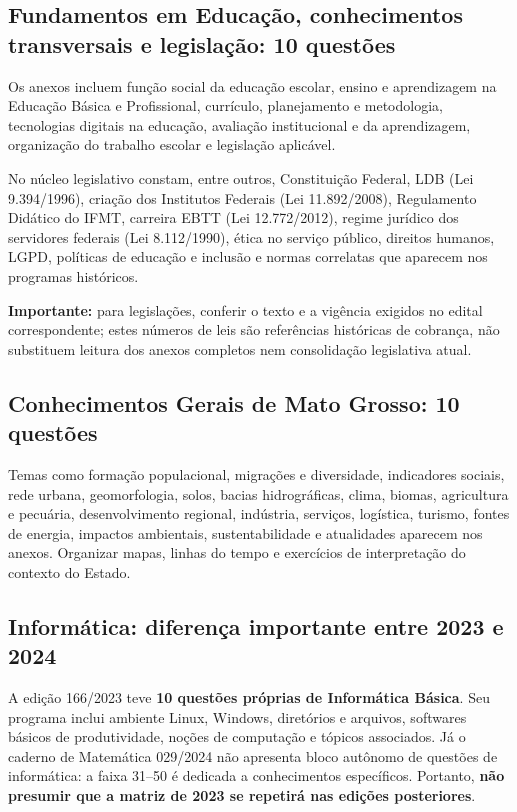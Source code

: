 \documentclass[11pt,a4paper]{article}
\begin{document}
\subsection{Fundamentos em Educação, conhecimentos transversais e legislação: 10 questões}
Os anexos incluem função social da educação escolar, ensino e aprendizagem na Educação Básica e Profissional, currículo, planejamento e metodologia, tecnologias digitais na educação, avaliação institucional e da aprendizagem, organização do trabalho escolar e legislação aplicável.

No núcleo legislativo constam, entre outros, Constituição Federal, LDB (Lei 9.394/1996), criação dos Institutos Federais (Lei 11.892/2008), Regulamento Didático do IFMT, carreira EBTT (Lei 12.772/2012), regime jurídico dos servidores federais (Lei 8.112/1990), ética no serviço público, direitos humanos, LGPD, políticas de educação e inclusão e normas correlatas que aparecem nos programas históricos.

\textbf{Importante:} para legislações, conferir o texto e a vigência exigidos no edital correspondente; estes números de leis são referências históricas de cobrança, não substituem leitura dos anexos completos nem consolidação legislativa atual.

\subsection{Conhecimentos Gerais de Mato Grosso: 10 questões}
Temas como formação populacional, migrações e diversidade, indicadores sociais, rede urbana, geomorfologia, solos, bacias hidrográficas, clima, biomas, agricultura e pecuária, desenvolvimento regional, indústria, serviços, logística, turismo, fontes de energia, impactos ambientais, sustentabilidade e atualidades aparecem nos anexos. Organizar mapas, linhas do tempo e exercícios de interpretação do contexto do Estado.

\subsection{Informática: diferença importante entre 2023 e 2024}
A edição 166/2023 teve \textbf{10 questões próprias de Informática Básica}. Seu programa inclui ambiente Linux, Windows, diretórios e arquivos, softwares básicos de produtividade, noções de computação e tópicos associados. Já o caderno de Matemática 029/2024 não apresenta bloco autônomo de questões de informática: a faixa 31--50 é dedicada a conhecimentos específicos. Portanto, \textbf{não presumir que a matriz de 2023 se repetirá nas edições posteriores}.
\end{document}
